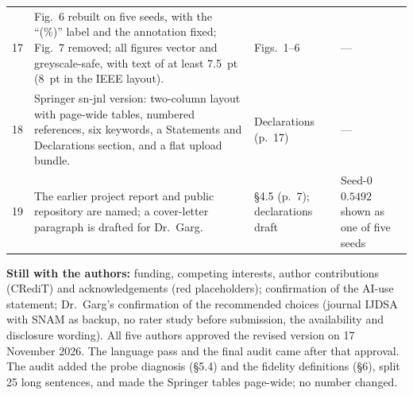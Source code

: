\documentclass[9pt]{extarticle}
\begin{document}
\begin{tabularx}{\textwidth}{@{}r>{\raggedright\arraybackslash}X>{\raggedright\arraybackslash}p{}>{\raggedright\arraybackslash}p{}@{}}
17 & Fig.~6 rebuilt on five seeds, with the ``(\%)'' label and the annotation fixed; Fig.~7 removed; all figures vector and greyscale-safe, with text of at least 7.5~pt (8~pt in the IEEE layout). & Figs.~1--6 & --- \\
18 & Springer sn-jnl version: two-column layout with page-wide tables, numbered references, six keywords, a Statements and Declarations section, and a flat upload bundle. & Declarations (p.~17) & --- \\
19 & The earlier project report and public repository are named; a cover-letter paragraph is drafted for Dr.~Garg. & \S4.5 (p.~7); declarations draft & Seed-0 $0.5492$ shown as one of five seeds \\
\bottomrule
\end{tabularx}

\vspace{5pt}
\noindent\textbf{Still with the authors:} funding, competing interests, author contributions (CRediT) and acknowledgements (red placeholders); confirmation of the AI-use statement; Dr.~Garg's confirmation of the recommended choices (journal IJDSA with SNAM as backup, no rater study before submission, the availability and disclosure wording). All five authors approved the revised version on 17 November 2026. The language pass and the final audit came after that approval. The audit added the probe diagnosis (\S5.4) and the fidelity definitions (\S6), split 25 long sentences, and made the Springer tables page-wide; no number changed.
\end{document}
